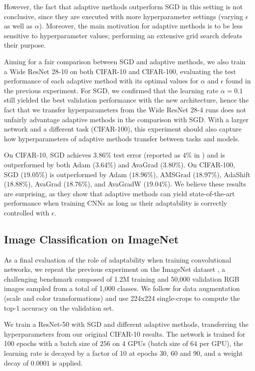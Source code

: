 \documentclass{article}
\begin{document}
However, the fact that adaptive methods outperform SGD in this setting is not
conclusive, since they are executed with more hyperparameter settings (varying
$\epsilon$ as well as $\alpha$).  Moreover, the main motivation for adaptive
methods is to be less sensitive to hyperparameter values; performing an
extensive grid search defeats their purpose.

Aiming for a fair comparison between SGD and adaptive methods, we also train a Wide ResNet 28-10 on both
CIFAR-10 and CIFAR-100, evaluating the test performance of each adaptive method with its
optimal values for $\alpha$ and $\epsilon$ found in the previous experiment. For SGD, we confirmed that the learning  rate $\alpha=0.1$ still yielded the best validation performance with the new architecture, hence the fact that we transfer hyperparameters from the Wide ResNet 28-4 runs does not unfairly advantage adaptive methods in the comparison with SGD. With a larger network and a different task (CIFAR-100), this experiment should
also capture how hyperparameters of adaptive methods transfer between tasks and
models.

On CIFAR-10, SGD achieves $3.86\%$ test error (reported as $4\%$ in
\citet{wide}) and is outperformed by both
      Adam ($3.64\%$) and
   AvaGrad ($3.80\%$).
On CIFAR-100, SGD ($19.05\%$) is outperformed by
    Adam ($18.96\%$),
 AMSGrad ($18.97\%$),
 AdaShift ($18.88\%$),
 AvaGrad ($18.76\%$), and
AvaGradW ($19.04\%$).
We believe these results are surprising, as they show that adaptive methods
can yield state-of-the-art performance when training CNNs as long as their
adaptability is correctly controlled with $\epsilon$.

\subsection{Image Classification on ImageNet}

As a final evaluation of the role of adaptability when training convolutional
networks, we repeat the previous experiment on the ImageNet dataset
\citep{imagenet}, a challenging benchmark composed of 1.2M training and 50,000 validation RGB images sampled from a total of 1,000 classes. We follow \citet{gross} for data augmentation (scale and color transformations) and use 224x224 single-crops to compute the top-1 accuracy on the validation set.

We train a ResNet-50 \citep{resnet2} with SGD and different
adaptive methods, transferring the hyperparameters from our original CIFAR-10
results.  The network is trained for 100 epochs
with a batch size of $256$ on 4 GPUs (batch size of $64$ per GPU), the learning rate is decayed by a factor of 10 at
epochs 30, 60 and 90, and a weight decay of $0.0001$ is applied. 
\end{document}
